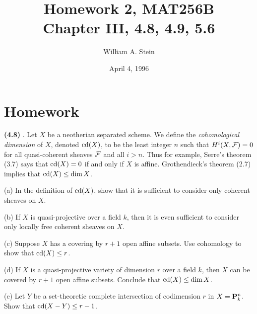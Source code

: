 \documentclass[12pt]{article}
\author{William A. Stein}
\title{Homework 2, MAT256B\\Chapter III, 4.8, 4.9, 5.6}
\date{April 4, 1996}
\begin{document}
\maketitle

\section{Homework}

\begin{exercise}
{\bfseries (4.8)} . Let $X$ be a neotherian separated scheme.
We define the {\em cohomological dimension} of $X$, denoted $\cd(X)$, to
be the least integer $n$ such that $H^{i}(X,\F)=0$ for all quasi-coherent
sheaves $\F$ and all $i>n$. Thus for example, Serre's theorem (3.7) says
that $\cd(X)=0$ if and only if $X$ is affine. Grothendieck's theorem (2.7)
implies that $\cd(X)\leq\dim X$. 

(a) In the definition of $\cd(X)$, show that it is sufficient to 
consider only coherent sheaves on $X$. 

(b) If $X$ is quasi-projective over a field $k$, then it is 
even sufficient to consider only locally free coherent sheaves
on $X$. 

(c) Suppose $X$ has a covering by $r+1$ open affine subsets. Use
\cech{} cohomology to show that $\cd(X)\leq r$. 

(d) If $X$ is a quasi-projective variety of dimension $r$ over a field
$k$, then $X$ can be covered by $r+1$ open affine subsets. Conclude
that $\cd(X)\leq \dim X$. 

(e) Let $Y$ be a set-theoretic complete intersection of 
codimension $r$ in $X=\P_k^n$. Show that $\cd(X-Y)\leq r-1$. 
\end{exercise}
\end{document}
